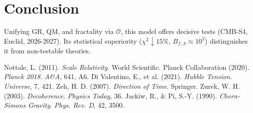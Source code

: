 \documentclass[aps,prl,twocolumn,groupedaddress]{revtex4-2}
\newcommand{\Opp}{\mathcal{O}}
\begin{document}
\section{Conclusion}
Unifying GR, QM, and fractality via \(\Opp\), this model offers decisive tests (CMB-S4, Euclid, 2026-2027). Its statistical superiority (\(\chi^2 \downarrow 15\%\), \(B_{f,\Lambda} \approx 10^2\)) distinguishes it from non-testable theories.

\begin{thebibliography}{9}
 Nottale, L. (2011). \textit{Scale Relativity}. World Scientific.
 Planck Collaboration (2020). \textit{Planck 2018}. \textit{A\&A}, 641, A6.
 Di Valentino, E., et al. (2021). \textit{Hubble Tension}. \textit{Universe}, 7, 421.
 Zeh, H. D. (2007). \textit{Direction of Time}. Springer.
 Zurek, W. H. (2003). \textit{Decoherence}. \textit{Physics Today}, 36.
 Jackiw, R., & Pi, S.-Y. (1990). \textit{Chern-Simons Gravity}. \textit{Phys. Rev. D}, 42, 3500.
\end{thebibliography}
\end{document}
